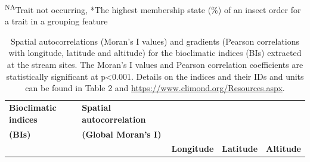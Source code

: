 \vspace{-0.45cm}

\footnotesize
\textsuperscript{NA}Trait not occurring, *The highest membership state (\%) of an insect order for a trait in a grouping feature

\normalsize

\newpage

\begin{table}[hp!]

\label{Table C.2}

\caption{Spatial autocorrelations (Moran's I values) and gradients (Pearson correlations with longitude, latitude and altitude) for the bioclimatic indices (BIs) extracted at the stream sites. The Moran's I values and Pearson correlation coefficients are statistically significant at p<0.001. Details on the indices and their IDs and units can be found in Table 2 and \href{https://www.climond.org/Resources.aspx}{https://www.climond.org/Resources.aspx}.}

\centering

\begin{tabular}{>{\centering\arraybackslash}m{2.0cm}>{\centering\arraybackslash}m{2.0cm}>{\centering\arraybackslash}m{1.5cm}>{\centering\arraybackslash}m{1.5cm}>{\centering\arraybackslash}m{1.0cm}}

\toprule
\textbf{Bioclimatic indices} & \textbf{Spatial autocorrelation} & \multicolumn{3}{c}{\textbf{Correlation (Pearson) with spatial variables}}\\
\textbf{(BIs)} & \textbf{(Global Moran's I)} & & & \\
 & & \textbf{Longitude} & \textbf{Latitude} & \textbf{Altitude}\\

\midrule


\end{tabular}
\end{table}
